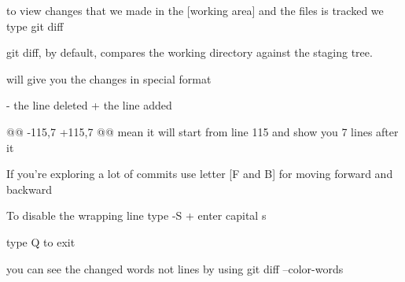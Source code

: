 to view changes that we made in the [working area] and the files is tracked we type 
  git diff 

git diff, by default, compares the working directory against the staging tree.

will give you the changes in special format 

- the line deleted 
+ the line added 

@@ -115,7 +115,7 @@ 
mean it will start from line 115 and show you 7 lines after it 

If you're exploring a lot of commits use letter [F and B] for moving forward and backward

To disable the wrapping line type 
-S  + enter  capital s 

type Q  to exit 


you can see the changed words not lines by using 
  git diff --color-words

